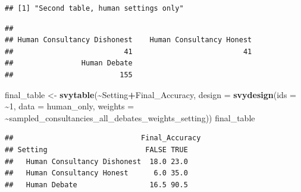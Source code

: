 \documentclass[
]{article}
\newenvironment{Shaded}{\begin{snugshade}}{\end{snugshade}}
\newcommand{\AttributeTok}[1]{\textcolor[rgb]{0.13,0.29,0.53}{#1}}
\newcommand{\ConstantTok}[1]{\textcolor[rgb]{0.56,0.35,0.01}{#1}}
\newcommand{\DecValTok}[1]{\textcolor[rgb]{0.00,0.00,0.81}{#1}}
\newcommand{\FunctionTok}[1]{\textcolor[rgb]{0.13,0.29,0.53}{\textbf{#1}}}
\newcommand{\NormalTok}[1]{#1}
\newcommand{\OtherTok}[1]{\textcolor[rgb]{0.56,0.35,0.01}{#1}}
\newcommand{\SpecialCharTok}[1]{\textcolor[rgb]{0.81,0.36,0.00}{\textbf{#1}}}
\newcommand{\StringTok}[1]{\textcolor[rgb]{0.31,0.60,0.02}{#1}}
\begin{document}
\begin{verbatim}
## [1] "Second table, human settings only"
\end{verbatim}

\begin{Shaded}
\end{Shaded}

\begin{verbatim}
## 
## Human Consultancy Dishonest    Human Consultancy Honest 
##                          41                          41 
##                Human Debate 
##                         155
\end{verbatim}

\begin{Shaded}
\begin{Highlighting}[]
\NormalTok{final\_table }\OtherTok{\textless{}{-}} \FunctionTok{svytable}\NormalTok{(}\SpecialCharTok{\textasciitilde{}}\NormalTok{Setting}\SpecialCharTok{+}\NormalTok{Final\_Accuracy, }
                        \AttributeTok{design =} \FunctionTok{svydesign}\NormalTok{(}\AttributeTok{ids =} \SpecialCharTok{\textasciitilde{}}\DecValTok{1}\NormalTok{, }
                                           \AttributeTok{data =}\NormalTok{ human\_only,}
                                           \AttributeTok{weights =} \SpecialCharTok{\textasciitilde{}}\NormalTok{sampled\_consultancies\_all\_debates\_weights\_setting))}
\NormalTok{final\_table}
\end{Highlighting}
\end{Shaded}

\begin{verbatim}
##                              Final_Accuracy
## Setting                       FALSE TRUE
##   Human Consultancy Dishonest  18.0 23.0
##   Human Consultancy Honest      6.0 35.0
##   Human Debate                 16.5 90.5
\end{verbatim}
\end{document}
